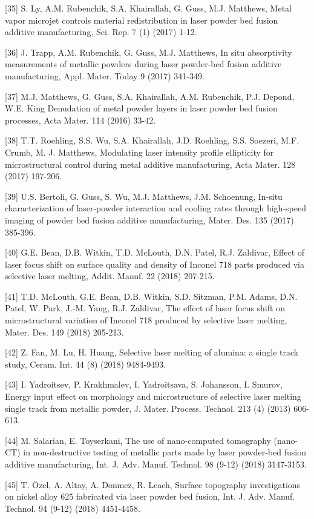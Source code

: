 \documentclass[10pt]{article}
\begin{document}
[35] S. Ly, A.M. Rubenchik, S.A. Khairallah, G. Guss, M.J. Matthews, Metal vapor microjet controls material redistribution in laser powder bed fusion additive manufacturing, Sci. Rep. 7 (1) (2017) 1-12.

[36] J. Trapp, A.M. Rubenchik, G. Guss, M.J. Matthews, In situ absorptivity measurements of metallic powders during laser powder-bed fusion additive manufacturing, Appl. Mater. Today 9 (2017) 341-349.

[37] M.J. Matthews, G. Guss, S.A. Khairallah, A.M. Rubenchik, P.J. Depond, W.E. King Denudation of metal powder layers in laser powder bed fusion processes, Acta Mater. 114 (2016) 33-42.

[38] T.T. Roehling, S.S. Wu, S.A. Khairallah, J.D. Roehling, S.S. Soezeri, M.F. Crumb, M. J. Matthews, Modulating laser intensity profile ellipticity for microstructural control during metal additive manufacturing, Acta Mater. 128 (2017) 197-206.

[39] U.S. Bertoli, G. Guss, S. Wu, M.J. Matthews, J.M. Schoenung, In-situ characterization of laser-powder interaction and cooling rates through high-speed imaging of powder bed fusion additive manufacturing, Mater. Des. 135 (2017) 385-396.

[40] G.E. Bean, D.B. Witkin, T.D. McLouth, D.N. Patel, R.J. Zaldivar, Effect of laser focus shift on surface quality and density of Inconel 718 parts produced via selective laser melting, Addit. Manuf. 22 (2018) 207-215.

[41] T.D. McLouth, G.E. Bean, D.B. Witkin, S.D. Sitzman, P.M. Adams, D.N. Patel, W. Park, J.-M. Yang, R.J. Zaldivar, The effect of laser focus shift on microstructural variation of Inconel 718 produced by selective laser melting, Mater. Des. 149 (2018) 205-213.

[42] Z. Fan, M. Lu, H. Huang, Selective laser melting of alumina: a single track study, Ceram. Int. 44 (8) (2018) 9484-9493.

[43] I. Yadroitsev, P. Krakhmalev, I. Yadroitsava, S. Johansson, I. Smurov, Energy input effect on morphology and microstructure of selective laser melting single track from metallic powder, J. Mater. Process. Technol. 213 (4) (2013) 606-613.

[44] M. Salarian, E. Toyserkani, The use of nano-computed tomography (nano-CT) in non-destructive testing of metallic parts made by laser powder-bed fusion additive manufacturing, Int. J. Adv. Manuf. Technol. 98 (9-12) (2018) 3147-3153.

[45] T. Özel, A. Altay, A. Donmez, R. Leach, Surface topography investigations on nickel alloy 625 fabricated via laser powder bed fusion, Int. J. Adv. Manuf. Technol. 94 (9-12) (2018) 4451-4458.
\end{document}
